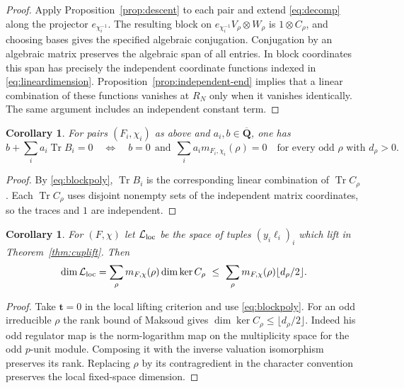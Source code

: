 \documentclass[11pt]{amsart}
\numberwithin{equation}{section}
\newtheorem{corollary}[theorem]{Corollary}
\theoremstyle{definition}
\theoremstyle{remark}
\newcommand{\Qbar}{\overline{\mathbf Q}}
\newcommand{\Tr}{\operatorname{Tr}}
\begin{document}
\begin{proof}
Apply Proposition~\ref{prop:descent} to each pair and extend
\eqref{eq:decomp} along the projector $e_{\chi_i^{-1}}$.
The resulting block on
$e_{\chi_i^{-1}}V_\rho\otimes W_\rho$ is
$1\otimes C_\rho$, and choosing bases gives the specified
algebraic conjugation. Conjugation by an algebraic matrix
preserves the algebraic span of all entries. In block
coordinates this span has precisely the independent
coordinate functions indexed in \eqref{eq:lineardimension}.
Proposition~\ref{prop:independent-end} implies that a linear
combination of these functions vanishes at $R_N$ only
when it vanishes identically. The same argument includes
an independent constant term.
\end{proof}

\begin{corollary}\label{cor:traces}
For pairs $(F_i,\chi_i)$ as above and
$a_i,b\in\Qbar$, one has
\[
 b+\sum_i a_i\Tr B_i=0
 \quad\Longleftrightarrow\quad
 b=0\ \ \text{and}\ \
 \sum_i a_i m_{F_i,\chi_i}(\rho)=0
 \quad\text{for every odd }\rho\text{ with }d_\rho>0 .
\]
\end{corollary}

\begin{proof}
By \eqref{eq:blockpoly}, $\Tr B_i$ is the corresponding
linear combination of $\Tr C_\rho$. Each $\Tr C_\rho$
uses disjoint nonempty sets of the independent matrix
coordinates, so the traces and $1$ are independent.
\end{proof}

\begin{corollary}\label{cor:liftbound}
For $(F,\chi)$ let $\mathcal L_{\rm loc}$ be the space of tuples
$(y_i\ell_i)_i$ which lift in Theorem~\ref{thm:cuplift}. Then
\[
 \dim \mathcal L_{\rm loc}
 =\sum_\rho m_{F,\chi}(\rho)\dim\ker C_\rho
 \ \le\ \sum_\rho m_{F,\chi}(\rho)\lfloor d_\rho/2\rfloor .
\]
\end{corollary}

\begin{proof}
Take $\mathbf t=0$ in the local lifting criterion and use
\eqref{eq:blockpoly}. For an odd irreducible $\rho$ the rank
bound of Maksoud \cite[Th.~4.3 and the proof of Th.~4.6]{Maksoud}
gives $\dim\ker C_\rho\le\lfloor d_\rho/2\rfloor$.
Indeed his odd regulator map is the norm-logarithm map on the
multiplicity space for the odd $p$-unit module. Composing it with
the inverse valuation isomorphism preserves its rank. Replacing
$\rho$ by its contragredient in the character convention preserves
the local fixed-space dimension.
\end{proof}
\end{document}
